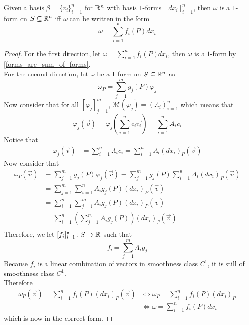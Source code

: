 \documentclass[notes]{subfiles}
\begin{document}
\begin{theorem}
    Given a basis $\beta = \{ \vec{v_i} \}_{i = 1}^n$ for $\mathbb{R}^n$ with basis $1$-forms $[dx_i]_{i = 1}^n$, then $\omega$ is a $1$-form on $S \subseteq \mathbb{R}^n$ iff $\omega$ can be written in the form
    \[
        \omega = \sum_{i = 1}^n f_i(P)dx_i
    \]
\end{theorem}
\begin{proof}
    For the first direction, let $\omega = \sum_{i = 1}^n f_i(P)dx_i$, then $\omega$ is a $1$-form by \cref{forms_are_sum_of_forms}. \\
    For the second direction, let $\omega$ be a $1$-form on $S \subseteq \mathbb{R}^n$ as
    \[
        \omega_P = \sum_{j = 1}^m g_j(P)\varphi_j
    \]
    Now consider that for all $[\varphi_j]_{j = 1}^m$, $\mathcal{M}(\varphi_j) = (A_i)_{i = 1}^n$ which means that
    \[
        \varphi_j(\vec{v}) = \varphi_j\left( \sum_{i = 1}^n c_i\vec{v_i} \right) = \sum_{i = 1}^n A_ic_i
    \]
    Notice that
    \begin{align*}
        \varphi_j(\vec{v})
        &= \sum_{i = 1}^n A_ic_i
        = \sum_{i = 1}^n A_i(dx_i)_P(\vec{v})
    \end{align*}
    Now consider that
    \begin{align*}
        \omega_P(\vec{v})
        &= \sum_{j = 1}^m g_j(P)\varphi_j(\vec{v})
        = \sum_{j = 1}^m g_j(P)\sum_{i = 1}^n A_i(dx_i)_P(\vec{v}) \\
        &= \sum_{j = 1}^m \sum_{i = 1}^n A_i g_j(P) (dx_i)_P(\vec{v}) \\
        &= \sum_{i = 1}^n \sum_{j = 1}^m A_i g_j(P) (dx_i)_P(\vec{v}) \\
        &= \sum_{i = 1}^n \left( \sum_{j = 1}^m A_i g_j(P) \right) (dx_i)_P(\vec{v}) \\
    \end{align*}
    Therefore, we let $[f_i]_{i = 1}^n\colon S \to \mathbb{R}$ such that
    \[
        f_i = \sum_{j = 1}^m A_i g_j
    \]
    Because $f_i$ is a linear combination of vectors in smoothness class $C^1$, it is still of smoothness class $C^1$. \\
    Therefore
    \begin{align*}
        \omega_P(\vec{v}) = \sum_{i = 1}^n f_i(P) (dx_i)_P(\vec{v})
        &\iff \omega_P = \sum_{i = 1}^n f_i(P) (dx_i)_P \\
        &\iff \omega = \sum_{i = 1}^n f_i(P) dx_i
    \end{align*}
    which is now in the correct form.
\end{proof}
\end{document}
